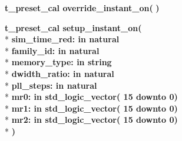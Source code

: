\begin{DoxyCompactItemize}
\item 
{\bfseries {\bfseries \textcolor{vhdlchar}{t\+\_\+preset\+\_\+cal}\textcolor{vhdlchar}{ }}} {\bf override\+\_\+instant\+\_\+on}{\bfseries  ( }{\bfseries  )} 
\item 
{\bfseries {\bfseries \textcolor{vhdlchar}{t\+\_\+preset\+\_\+cal}\textcolor{vhdlchar}{ }}} {\bf setup\+\_\+instant\+\_\+on}{\bfseries  ( }\\*
{\bfseries \textcolor{vhdlchar}{sim\+\_\+time\+\_\+red\+: }\textcolor{stringliteral}{in }{\bfseries \textcolor{comment}{natural}\textcolor{vhdlchar}{ }}}\\*
{\bfseries \textcolor{vhdlchar}{family\+\_\+id\+: }\textcolor{stringliteral}{in }{\bfseries \textcolor{comment}{natural}\textcolor{vhdlchar}{ }}}\\*
{\bfseries \textcolor{vhdlchar}{memory\+\_\+type\+: }\textcolor{stringliteral}{in }{\bfseries \textcolor{comment}{string}\textcolor{vhdlchar}{ }}}\\*
{\bfseries \textcolor{vhdlchar}{dwidth\+\_\+ratio\+: }\textcolor{stringliteral}{in }{\bfseries \textcolor{comment}{natural}\textcolor{vhdlchar}{ }}}\\*
{\bfseries \textcolor{vhdlchar}{pll\+\_\+steps\+: }\textcolor{stringliteral}{in }{\bfseries \textcolor{comment}{natural}\textcolor{vhdlchar}{ }}}\\*
{\bfseries \textcolor{vhdlchar}{mr0\+: }\textcolor{stringliteral}{in }\textcolor{vhdlchar}{std\+\_\+logic\+\_\+vector( 15 downto  0)}}\\*
{\bfseries \textcolor{vhdlchar}{mr1\+: }\textcolor{stringliteral}{in }\textcolor{vhdlchar}{std\+\_\+logic\+\_\+vector( 15 downto  0)}}\\*
{\bfseries \textcolor{vhdlchar}{mr2\+: }\textcolor{stringliteral}{in }\textcolor{vhdlchar}{std\+\_\+logic\+\_\+vector( 15 downto  0)}}\\*
{\bfseries  )} 
\end{DoxyCompactItemize}
